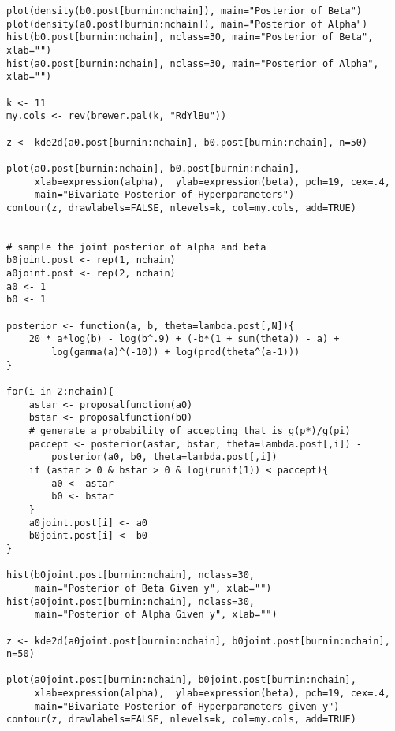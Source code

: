\documentclass{article} %
\begin{document}
\begin{enumerate}
\begin{lstlisting}
plot(density(b0.post[burnin:nchain]), main="Posterior of Beta")
plot(density(a0.post[burnin:nchain]), main="Posterior of Alpha")
hist(b0.post[burnin:nchain], nclass=30, main="Posterior of Beta", xlab="")
hist(a0.post[burnin:nchain], nclass=30, main="Posterior of Alpha", xlab="")

k <- 11
my.cols <- rev(brewer.pal(k, "RdYlBu"))

z <- kde2d(a0.post[burnin:nchain], b0.post[burnin:nchain], n=50)

plot(a0.post[burnin:nchain], b0.post[burnin:nchain],
     xlab=expression(alpha),  ylab=expression(beta), pch=19, cex=.4,
     main="Bivariate Posterior of Hyperparameters")
contour(z, drawlabels=FALSE, nlevels=k, col=my.cols, add=TRUE)


# sample the joint posterior of alpha and beta
b0joint.post <- rep(1, nchain)
a0joint.post <- rep(2, nchain)
a0 <- 1
b0 <- 1

posterior <- function(a, b, theta=lambda.post[,N]){
    20 * a*log(b) - log(b^.9) + (-b*(1 + sum(theta)) - a) +
        log(gamma(a)^(-10)) + log(prod(theta^(a-1)))
}

for(i in 2:nchain){
    astar <- proposalfunction(a0)
    bstar <- proposalfunction(b0)
    # generate a probability of accepting that is g(p*)/g(pi)
    paccept <- posterior(astar, bstar, theta=lambda.post[,i]) -
        posterior(a0, b0, theta=lambda.post[,i])
    if (astar > 0 & bstar > 0 & log(runif(1)) < paccept){
        a0 <- astar
        b0 <- bstar
    }
    a0joint.post[i] <- a0
    b0joint.post[i] <- b0
}

hist(b0joint.post[burnin:nchain], nclass=30,
     main="Posterior of Beta Given y", xlab="")
hist(a0joint.post[burnin:nchain], nclass=30,
     main="Posterior of Alpha Given y", xlab="")

z <- kde2d(a0joint.post[burnin:nchain], b0joint.post[burnin:nchain], n=50)

plot(a0joint.post[burnin:nchain], b0joint.post[burnin:nchain],
     xlab=expression(alpha),  ylab=expression(beta), pch=19, cex=.4,
     main="Bivariate Posterior of Hyperparameters given y")
contour(z, drawlabels=FALSE, nlevels=k, col=my.cols, add=TRUE)
\end{lstlisting}

\end{enumerate}
\end{document}
